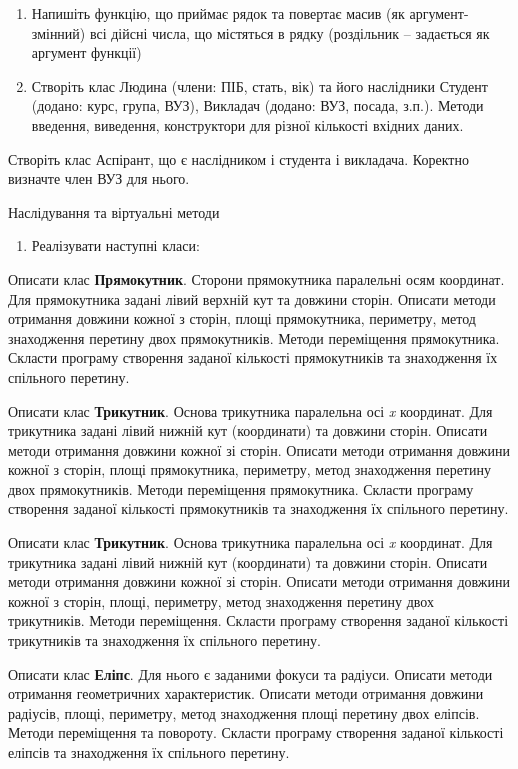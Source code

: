 \documentclass[]{article}
\begin{document}
\begin{enumerate}
\def\labelenumi{\arabic{enumi})}
\item
  Напишіть функцію, що приймає рядок та повертає масив (як
  аргумент-змінний) всі дійсні числа, що містяться в рядку (роздільник
  -- задається як аргумент функції)
\item
  Створіть клас Людина (члени: ПІБ, стать, вік) та його наслідники
  Студент (додано: курс, група, ВУЗ), Викладач (додано: ВУЗ, посада,
  з.п.). Методи введення, виведення, конструктори для різної кількості
  вхідних даних.
\end{enumerate}

Створіть клас Аспірант, що є наслідником і студента і викладача.
Коректно визначте член ВУЗ для нього.

Наслідування та віртуальні методи

\begin{enumerate}
\def\labelenumi{\arabic{enumi})}
\item
  Реалізувати наступні класи:
\end{enumerate}

Описати клас \textbf{Прямокутник}. Сторони прямокутника паралельні осям
координат. Для прямокутника задані лівий верхній кут та довжини сторін.
Описати методи отримання довжини кожної з сторін, площі прямокутника,
периметру, метод знаходження перетину двох прямокутників. Методи
переміщення прямокутника. Скласти програму створення заданої кількості
прямокутників та знаходження їх спільного перетину.

Описати клас \textbf{Трикутник}. Основа трикутника паралельна осі
\emph{x} координат. Для трикутника задані лівий нижній кут (координати)
та довжини сторін. Описати методи отримання довжини кожної зі сторін.
Описати методи отримання довжини кожної з сторін, площі прямокутника,
периметру, метод знаходження перетину двох прямокутників. Методи
переміщення прямокутника. Скласти програму створення заданої кількості
прямокутників та знаходження їх спільного перетину.

Описати клас \textbf{Трикутник}. Основа трикутника паралельна осі
\emph{x} координат. Для трикутника задані лівий нижній кут (координати)
та довжини сторін. Описати методи отримання довжини кожної зі сторін.
Описати методи отримання довжини кожної з сторін, площі, периметру,
метод знаходження перетину двох трикутників. Методи переміщення. Скласти
програму створення заданої кількості трикутників та знаходження їх
спільного перетину.

Описати клас \textbf{Еліпс}. Для нього є заданими фокуси та радіуси.
Описати методи отримання геометричних характеристик. Описати методи
отримання довжини радіусів, площі, периметру, метод знаходження площі
перетину двох еліпсів. Методи переміщення та повороту. Скласти програму
створення заданої кількості еліпсів та знаходження їх спільного
перетину.
\end{document}
